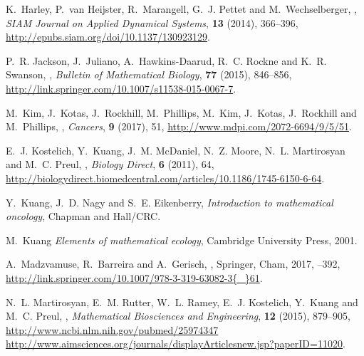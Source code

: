 \documentclass{aims}
\numberwithin{equation}{section}
\begin{document}
\begin{thebibliography}{10}
\newblock K.~Harley, P.~van Heijster, R.~Marangell, G.~J. Pettet and
  M.~Wechselberger,
,
\newblock \emph{SIAM Journal on Applied Dynamical Systems}, \textbf{13} (2014),
  366--396,
\newblock \urlprefix\url{http://epubs.siam.org/doi/10.1137/130923129}.

\newblock P.~R. Jackson, J.~Juliano, A.~Hawkins-Daarud, R.~C. Rockne and K.~R.
  Swanson,
,
\newblock \emph{Bulletin of Mathematical Biology}, \textbf{77} (2015),
  846--856,
\newblock \urlprefix\url{http://link.springer.com/10.1007/s11538-015-0067-7}.

\newblock M.~Kim, J.~Kotas, J.~Rockhill, M.~Phillips, M.~Kim, J.~Kotas,
  J.~Rockhill and M.~Phillips,
,
\newblock \emph{Cancers}, \textbf{9} (2017), 51,
\newblock \urlprefix\url{http://www.mdpi.com/2072-6694/9/5/51}.

\newblock E.~J. Kostelich, Y.~Kuang, J.~M. McDaniel, N.~Z. Moore, N.~L.
  Martirosyan and M.~C. Preul,
,
\newblock \emph{Biology Direct}, \textbf{6} (2011), 64,
\newblock
  \urlprefix\url{http://biologydirect.biomedcentral.com/articles/10.1186/1745-6150-6-64}.

\newblock Y.~Kuang, J.~D. Nagy and S.~E. Eikenberry,
\newblock \emph{{Introduction to mathematical oncology}},
\newblock Chapman and Hall/CRC.

\newblock M.~Kuang
\newblock \emph{{Elements of mathematical ecology}},
\newblock Cambridge University Press, 2001.

\newblock A.~Madzvamuse, R.~Barreira and A.~Gerisch,
,
\newblock Springer, Cham, 2017,
--392,
\newblock
  \urlprefix\url{http://link.springer.com/10.1007/978-3-319-63082-3{\_}61}.

\newblock N.~L. Martirosyan, E.~M. Rutter, W.~L. Ramey, E.~J. Kostelich,
  Y.~Kuang and M.~C. Preul,
,
\newblock \emph{Mathematical Biosciences and Engineering}, \textbf{12} (2015),
  879--905,
\newblock \urlprefix\url{http://www.ncbi.nlm.nih.gov/pubmed/25974347
  http://www.aimsciences.org/journals/displayArticlesnew.jsp?paperID=11020}.


\end{thebibliography}
\end{document}
